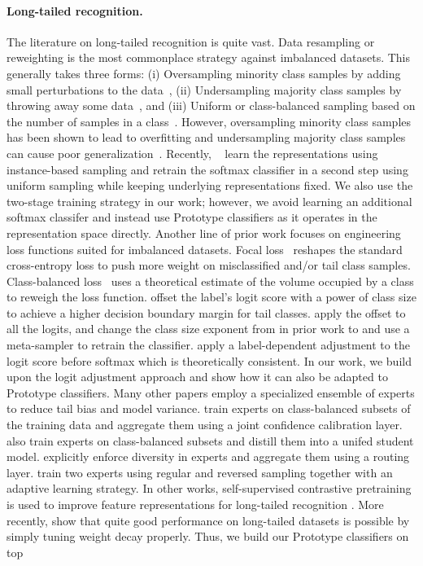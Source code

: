 \documentclass{article}
\begin{document}
\paragraph{Long-tailed recognition.} The literature on long-tailed recognition is quite vast. Data resampling or reweighting is the most commonplace strategy against imbalanced datasets. This generally takes three forms: (i) Oversampling minority class samples by adding small perturbations to the data~\cite{chawla2002smote,chawla2003smoteboost}, (ii) Undersampling majority class samples by throwing away some data~\cite{drummond2003c4}, and (iii) Uniform or class-balanced sampling based on the number of samples in a class~\cite{sun2019meta,xian2019f}. However, oversampling minority class samples has been shown to lead to overfitting and undersampling majority class samples can cause poor generalization~\cite{he2009learning}. Recently, ~\cite{kang2019decoupling} learn the representations using instance-based sampling and retrain the softmax classifier in a second step using uniform sampling while keeping underlying representations fixed. We also use the two-stage training strategy in our work; however, we avoid learning an additional softmax classifer and instead use Prototype classifiers as it operates in the representation space directly. Another line of prior work focuses on engineering loss functions suited for imbalanced datasets. Focal loss~\cite{lin2017focal} reshapes the standard cross-entropy loss to push more weight on misclassified and/or tail class samples. Class-balanced loss~\cite{cui2019class} uses a theoretical estimate of the volume occupied by a class to reweigh the loss function. \cite{cao2019learning} offset the label's logit score with a power of class size to achieve a higher decision boundary margin for tail classes. \cite{ren2020balanced} apply the offset to all the logits, and change the class size exponent from  in prior work to  and use a meta-sampler to retrain the classifier. \cite{menon2020long} apply a label-dependent adjustment to the logit score before softmax which is theoretically consistent. In our work, we build upon the logit adjustment approach and show how it can also be adapted to Prototype classifiers. Many other papers employ a specialized ensemble of experts to reduce tail bias and model variance. \cite{sharma2020long} train experts on class-balanced subsets of the training data and aggregate them using a joint confidence calibration layer. \cite{xiang2020learning} also train experts on class-balanced subsets and distill them into a unifed student model. \cite{wang2020long} explicitly enforce diversity in experts and aggregate them using a routing layer. \cite{zhou2020bbn} train two experts using regular and reversed sampling together with an adaptive learning strategy. In other works, self-supervised contrastive pretraining is used to improve feature representations for long-tailed recognition \cite{samuel2021distributional,cui2021parametric}. More recently, \cite{alshammari2022long} show that quite good performance on long-tailed datasets is possible by simply tuning weight decay properly. Thus, we build our Prototype classifiers on top 
\end{document}
